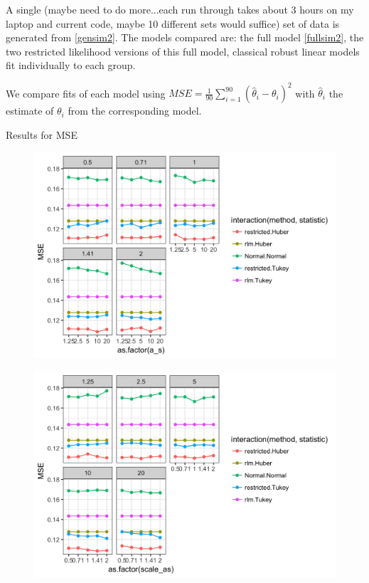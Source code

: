 \documentclass[12pt]{article}
\newcommand{\red}[1]{{\color{red}#1}}
\begin{document}
A single (\red{maybe need to do more...each run through takes about 3 hours on my laptop and current code, maybe 10 different sets would suffice}) set of data is generated from \eqref{gensim2}. The models compared are: the full model \eqref{fullsim2}, the two restricted likelihood versions of this full model, classical robust linear models fit individually to each group. 



We compare fits of each model using $MSE = \frac{1}{90}\sum_{i = 1}^{90} (\hat\theta_{i} -\theta_{i})^{2}$ with $\hat\theta_{i}$ the estimate of $\theta_{i}$ from the corresponding model. 

Results for MSE

\begin{figure}[H]
\centering
\includegraphics[scale = .3]{mse_sim2_facet_scale.png}
\end{figure}


\begin{figure}[H]
\centering
\includegraphics[scale = .3]{mse_sim2_facet_as.png}
\end{figure}
\end{document}
